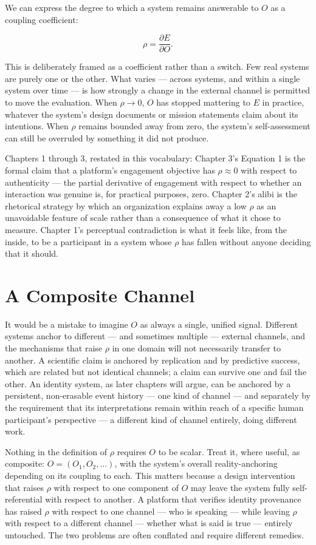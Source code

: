 \documentclass[12pt,a4paper]{book}
\begin{document}
We can express the degree to which a system remains answerable to $O$ as a coupling coefficient:

\[\rho = \frac{\partial E}{\partial O}.\]

This is deliberately framed as a coefficient rather than a switch. Few real systems are purely one or the other. What varies — across systems, and within a single system over time — is how strongly a change in the external channel is permitted to move the evaluation. When $\rho \to 0$, $O$ has stopped mattering to $E$ in practice, whatever the system's design documents or mission statements claim about its intentions. When $\rho$ remains bounded away from zero, the system's self-assessment can still be overruled by something it did not produce.

Chapters 1 through 3, restated in this vocabulary: Chapter 3's Equation 1 is the formal claim that a platform's engagement objective has $\rho \approx 0$ with respect to authenticity — the partial derivative of engagement with respect to whether an interaction was genuine is, for practical purposes, zero. Chapter 2's alibi is the rhetorical strategy by which an organization explains away a low $\rho$ as an unavoidable feature of scale rather than a consequence of what it chose to measure. Chapter 1's perceptual contradiction is what it feels like, from the inside, to be a participant in a system whose $\rho$ has fallen without anyone deciding that it should.

\section{A Composite Channel}

It would be a mistake to imagine $O$ as always a single, unified signal. Different systems anchor to different — and sometimes multiple — external channels, and the mechanisms that raise $\rho$ in one domain will not necessarily transfer to another. A scientific claim is anchored by replication and by predictive success, which are related but not identical channels; a claim can survive one and fail the other. An identity system, as later chapters will argue, can be anchored by a persistent, non-erasable event history — one kind of channel — and separately by the requirement that its interpretations remain within reach of a specific human participant's perspective — a different kind of channel entirely, doing different work.

Nothing in the definition of $\rho$ requires $O$ to be scalar. Treat it, where useful, as composite: $O = (O_1, O_2, \ldots)$, with the system's overall reality-anchoring depending on its coupling to each. This matters because a design intervention that raises $\rho$ with respect to one component of $O$ may leave the system fully self-referential with respect to another. A platform that verifies identity provenance has raised $\rho$ with respect to one channel — who is speaking — while leaving $\rho$ with respect to a different channel — whether what is said is true — entirely untouched. The two problems are often conflated and require different remedies.
\end{document}
